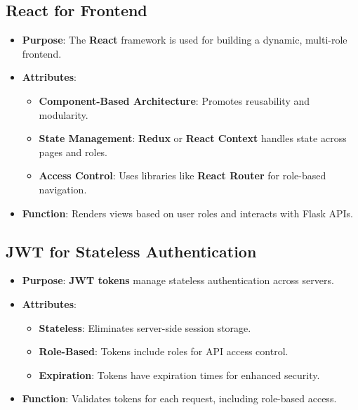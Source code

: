 \documentclass{article}
\begin{document}
\subsection{React for Frontend}
\begin{itemize}
    \item \textbf{Purpose}: The \textbf{React} framework is used for building a dynamic, multi-role frontend.
    \item \textbf{Attributes}:
    \begin{itemize}
        \item \textbf{Component-Based Architecture}: Promotes reusability and modularity.
        \item \textbf{State Management}: \textbf{Redux} or \textbf{React Context} handles state across pages and roles.
        \item \textbf{Access Control}: Uses libraries like \textbf{React Router} for role-based navigation.
    \end{itemize}
    \item \textbf{Function}: Renders views based on user roles and interacts with Flask APIs.
\end{itemize}

\subsection{JWT for Stateless Authentication}
\begin{itemize}
    \item \textbf{Purpose}: \textbf{JWT tokens} manage stateless authentication across servers.
    \item \textbf{Attributes}:
    \begin{itemize}
        \item \textbf{Stateless}: Eliminates server-side session storage.
        \item \textbf{Role-Based}: Tokens include roles for API access control.
        \item \textbf{Expiration}: Tokens have expiration times for enhanced security.
    \end{itemize}
    \item \textbf{Function}: Validates tokens for each request, including role-based access.
\end{itemize}
\end{document}
